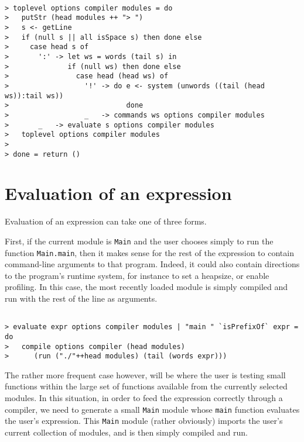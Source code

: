 \documentclass[a4paper]{article}
\begin{document}
\begin{verbatim}

> toplevel options compiler modules = do
>   putStr (head modules ++ "> ")
>   s <- getLine
>   if (null s || all isSpace s) then done else
>     case head s of
>       ':' -> let ws = words (tail s) in
>              if (null ws) then done else
>                case head (head ws) of
>                  '!' -> do e <- system (unwords ((tail (head ws)):tail ws))
>                            done
>                  _   -> commands ws options compiler modules
>       _   -> evaluate s options compiler modules
>   toplevel options compiler modules
> 
> done = return ()

\end{verbatim}





\section{Evaluation of an expression}

Evaluation of an expression can take one of three forms.

First, if the current module is {\tt Main} and the user chooses simply to
run the function {\tt Main.main}, then it makes sense for the rest
of the expression to contain command-line arguments to that program.
Indeed, it could also contain directions to the program's runtime
system, for instance to set a heapsize, or enable profiling.  In this
case, the most recently loaded module is simply compiled and run
with the rest of the line as arguments.

\begin{verbatim}

> evaluate expr options compiler modules | "main " `isPrefixOf` expr = do
>   compile options compiler (head modules)
>      (run ("./"++head modules) (tail (words expr)))

\end{verbatim}

The rather more frequent case however, will be where the user is
testing small functions within the large set of functions available
from the currently selected modules.  In this situation, in order to
feed the expression correctly through a compiler, we need to generate
a small {\tt Main} module whose {\tt main} function evaluates the
user's expression.  This {\tt Main} module (rather obviously) imports
the user's current collection of modules, and is then simply compiled
and run.
\end{document}

